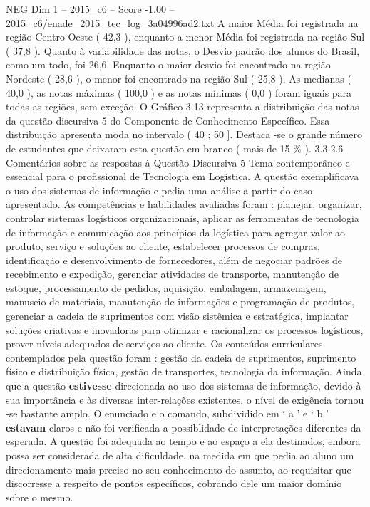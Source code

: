 \begin{textsample}{NEG Dim 1 – 2015\_c6 – Score -1.00 – 2015\_c6/enade\_2015\_tec\_log\_3a04996ad2.txt}
A maior Média foi registrada na região Centro-Oeste ( 42,3 ), enquanto a menor Média foi registrada na região Sul ( 37,8 ).
Quanto à variabilidade das notas, o Desvio padrão dos alunos do Brasil, como um todo, foi 26,6.
Enquanto o maior desvio foi encontrado na região Nordeste ( 28,6 ), o menor foi encontrado na região Sul ( 25,8 ).
As medianas ( 40,0 ), as notas máximas ( 100,0 ) e as notas mínimas ( 0,0 ) foram iguais para todas as regiões, sem exceção.
O Gráfico 3.13 representa a distribuição das notas da questão discursiva 5 do Componente de Conhecimento Específico.
Essa distribuição apresenta moda no intervalo ( 40 ; 50 ].
Destaca -se o grande número de estudantes que deixaram esta questão em branco ( mais de 15 \% ). 3.3.2.6 Comentários sobre as respostas à Questão Discursiva 5 Tema contemporâneo e essencial para o profissional de Tecnologia em Logística.
A questão exemplificava o uso dos sistemas de informação e pedia uma análise a partir do caso apresentado.
As competências e habilidades avaliadas foram : planejar, organizar, controlar sistemas logísticos organizacionais, aplicar as ferramentas de tecnologia de informação e comunicação aos princípios da logística para agregar valor ao produto, serviço e soluções ao cliente, estabelecer processos de compras, identificação e desenvolvimento de fornecedores, além de negociar padrões de recebimento e expedição, gerenciar atividades de transporte, manutenção de estoque, processamento de pedidos, aquisição, embalagem, armazenagem, manuseio de materiais, manutenção de informações e programação de produtos, gerenciar a cadeia de suprimentos com visão sistêmica e estratégica, implantar soluções criativas e inovadoras para otimizar e racionalizar os processos logísticos, prover níveis adequados de serviços ao cliente.
Os conteúdos curriculares contemplados pela questão foram : gestão da cadeia de suprimentos, suprimento físico e distribuição física, gestão de transportes, tecnologia da informação.
Ainda que a questão \textbf{estivesse} direcionada ao uso dos sistemas de informação, devido à sua importância e às diversas inter-relações existentes, o nível de exigência tornou -se bastante amplo.
O enunciado e o comando, subdividido em ‘ a ’ e ‘ b ’ \textbf{estavam} claros e não foi verificada a possiblidade de interpretações diferentes da esperada.
A questão foi adequada ao tempo e ao espaço a ela destinados, embora possa ser considerada de alta dificuldade, na medida em que pedia ao aluno um direcionamento mais preciso no seu conhecimento do assunto, ao requisitar que discorresse a respeito de pontos específicos, cobrando dele um maior domínio sobre o mesmo.

\end{textsample}
